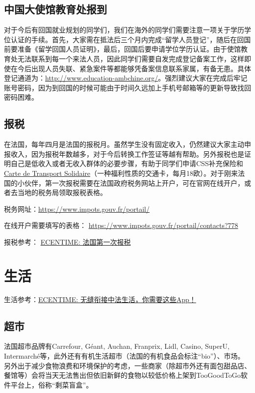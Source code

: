 \documentclass[UTF8]{ctexart}
\begin{document}
\subsection{中国大使馆教育处报到}

对于今后有回国就业规划的同学们，我们在海外的同学们需要注意一项关于学历学位认证的手续。首先，大家需在抵法后三个月内完成“留学人员登记”，随后在回国前要准备《留学回国人员证明》，最后，回国后要申请学位学历认证。由于使馆教育处无法联系到每一个来法人员，因此同学们需要自发完成登记备案工作，这样即使在今后出现人员失联、紧急案件等都能够凭备案信息联系家属，有备无患。具体登记通道为：\href{http://www.education-ambchine.org/}{http://www.education-ambchine.org/}。强烈建议大家在完成后牢记账号密码，因为到回国的时候可能由于时间久远加上手机号邮箱等的更新导致找回密码困难。

\subsection{报税}
在法国，每年四月是法国的报税月。虽然学生没有固定收入，仍然建议大家主动申报收入，因为报税年数越多，对于今后转换工作签证等越有帮助。另外报税也是证明自己是低收入或者无收入群体的必要步骤，有助于同学们申请CSS补充保险和\href{https://www.solidaritetransport.fr/}{Carte de Transport Solidaire}（一种福利性质的交通卡，每月18欧）。对于刚来法国的小伙伴，第一次报税需要在法国政府税务网站上开户，可在官网在线开户，或者去当地的税务局领取报税表格。

税务网址：\href{https://www.impots.gouv.fr/portail/}{https://www.impots.gouv.fr/portail/} 

在线开户需要填写的表格：
\href{https://www.impots.gouv.fr/portail/contacts?778}{https://www.impots.gouv.fr/portail/contacts?778}

报税参考：
\href{https://www.ecentime.com/article/ecentime-impots-france}{ECENTIME: 法国第一次报税}

\newpage
\section{生活}
生活参考：\href{https://www.ecentime.com/article/liste-app}{ECENTIME: 无缝衔接中法生活，你需要这些App！}


\subsection{超市}
	
法国超市品牌有Carrefour, Géant, Auchan, Franprix, Lidl, Casino, SuperU, Intermarché等，此外还有有机生活超市（法国的有机食品会标注“bio”）、市场。另外出于减少食物浪费和环境保护的考虑，一些商家（除超市外还有面包甜品店、餐馆等）会将当天无法售出但依旧新鲜的食物以较低价格上架到TooGoodToGo软件平台上，俗称“剩菜盲盒”。
\end{document}
